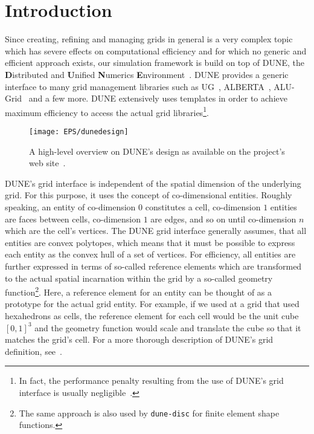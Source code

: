 \chapter{Introduction}

Since creating, refining and managing grids in general is a very
complex topic which has severe effects on computational efficiency and
for which no generic and efficient approach exists, our simulation
framework is build on top of DUNE, the \textbf{D}istributed and \textbf{U}nified
\textbf{N}umerics \textbf{E}nvironment~\cite{DUNE-HP}. DUNE provides a generic interface to many
grid management libraries such as UG~\cite{UG-HP}, ALBERTA~\cite{ALBERTA-HP},
ALU-Grid~\cite{ALUGRID-HP} and a few more. DUNE extensively uses templates in
order to achieve maximum efficiency to access the actual grid
libraries\footnote{In fact, the performance penalty resulting from the
  use of DUNE's grid interface is usually negligible~\cite{BURRI2006}.}.
\begin{figure}[hbt]
  \centering 
  \texttt{[image: EPS/dunedesign]}
  \caption{
    \label{fig:dune-design}
    A high-level overview on DUNE's design as available on the project's
    web site~\cite{DUNE-HP}.
  }
\end{figure}

DUNE's grid interface is independent of the spatial dimension of the
underlying grid. For this purpose, it uses the concept of
co-dimensional entities. Roughly speaking, an entity of co-dimension
$0$ constitutes a cell, co-dimension $1$ entities are faces between
cells, co-dimension $1$ are edges, and so on until co-dimension $n$
which are the cell's vertices.  The DUNE grid interface generally
assumes, that all entities are convex polytopes, which means that it
must be possible to express each entity as the convex hull of a set of
vertices. For efficiency, all entities are further expressed in terms
of so-called reference elements which are transformed to the actual
spatial incarnation within the grid by a so-called geometry
function\footnote{The same approach is also used by \texttt{dune-disc} for
  finite element shape functions.}. Here, a reference element for an
entity can be thought of as a prototype for the actual grid
entity. For example, if we used at a grid that used hexahedrons as cells,
the reference element for each cell would be the unit cube $[0, 1]^3$
and the geometry function would scale and translate the cube so that
it matches the grid's cell. For a more thorough description of DUNE's
grid definition, see~\cite{BASTIAN2008}.

